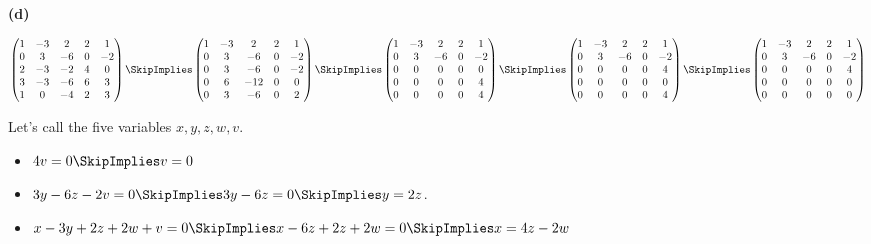 \documentclass[oneside,12pt]{amsart}
\begin{document}
\bigskip

\textbf{(d)}

\bigskip

$
\begin{pmatrix}
1 & -3 & 2 & 2 & 1   \\
0 &  3 & -6 & 0 & -2  \\
2 & -3 & -2 & 4 & 0  \\
3 & -3 & -6 & 6 & 3  \\
1 &  0 & -4 & 2 & 3
\end{pmatrix}
\SkipImplies
\begin{pmatrix}
1 & -3 & 2 & 2 & 1  \\
0 & 3 & -6 & 0 & -2 \\
0 & 3 & -6 & 0 & -2 \\
0 & 6 & -12 & 0 & 0 \\
0 & 3 & -6 & 0 & 2
\end{pmatrix}
\SkipImplies
\begin{pmatrix}
1 & -3 & 2 & 2 &  1   \\
0 & 3 & -6 & 0 & -2  \\
0 & 0 & 0 & 0 &   0    \\
0 & 0 & 0 & 0 &   4    \\
0 & 0 & 0 & 0 &   4
\end{pmatrix}
\SkipImplies
\begin{pmatrix}
1 & -3 & 2 & 2 & 1   \\
0 & 3 & -6 & 0 & -2  \\
0 & 0 & 0 & 0 & 4    \\
0 & 0 & 0 & 0 & 0    \\
0 & 0 & 0 & 0 & 4
\end{pmatrix}
\SkipImplies
\begin{pmatrix}
1 & -3 & 2 & 2 & 1   \\
0 & 3 & -6 & 0 & -2  \\
0 & 0 & 0 & 0 & 4    \\
0 & 0 & 0 & 0 & 0    \\
0 & 0 & 0 & 0 & 0
\end{pmatrix}
$

Let's call the five variables $x,y,z,w,v$.

\begin{itemize}
\item $4v=0 \SkipImplies v=0$
\item $3y -6z -2v = 0 \SkipImplies 3y -6z = 0 \SkipImplies y=2z$.
\item $x - 3y +2z +2w +v = 0 \SkipImplies x -6z +2z +2w = 0 \SkipImplies x = 4z - 2w$
\end{itemize}
\end{document}
